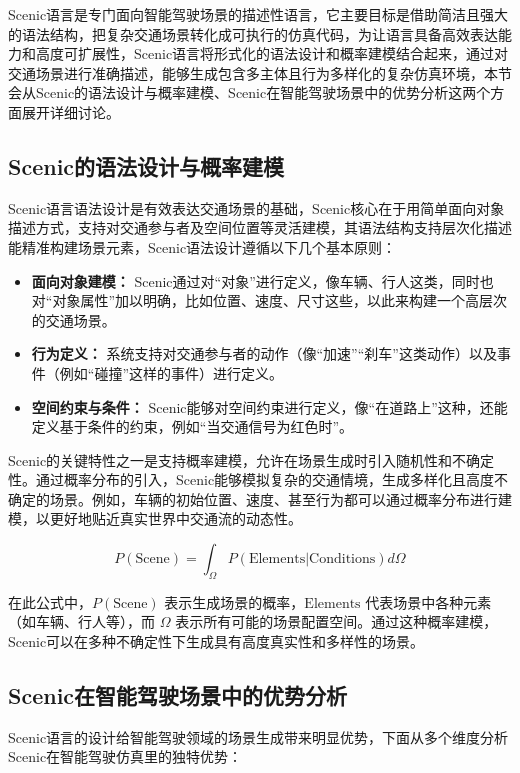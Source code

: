Scenic语言是专门面向智能驾驶场景的描述性语言，它主要目标是借助简洁且强大的语法结构，把复杂交通场景转化成可执行的仿真代码，为让语言具备高效表达能力和高度可扩展性，Scenic语言将形式化的语法设计和概率建模结合起来，通过对交通场景进行准确描述，能够生成包含多主体且行为多样化的复杂仿真环境，本节会从Scenic的语法设计与概率建模、Scenic在智能驾驶场景中的优势分析这两个方面展开详细讨论。
\subsection{Scenic的语法设计与概率建模}

Scenic语言语法设计是有效表达交通场景的基础，Scenic核心在于用简单面向对象描述方式，支持对交通参与者及空间位置等灵活建模，其语法结构支持层次化描述能精准构建场景元素，Scenic语法设计遵循以下几个基本原则：

\begin{itemize}
	\item \textbf{面向对象建模：} Scenic通过对“对象”进行定义，像车辆、行人这类，同时也对“对象属性”加以明确，比如位置、速度、尺寸这些，以此来构建一个高层次的交通场景。
	\item \textbf{行为定义：} 系统支持对交通参与者的动作（像“加速”“刹车”这类动作）以及事件（例如“碰撞”这样的事件）进行定义。
	\item \textbf{空间约束与条件：} Scenic能够对空间约束进行定义，像“在道路上”这种，还能定义基于条件的约束，例如“当交通信号为红色时”。
\end{itemize}

Scenic的关键特性之一是支持概率建模，允许在场景生成时引入随机性和不确定性。通过概率分布的引入，Scenic能够模拟复杂的交通情境，生成多样化且高度不确定的场景。例如，车辆的初始位置、速度、甚至行为都可以通过概率分布进行建模，以更好地贴近真实世界中交通流的动态性。

\begin{equation}
	P(\text{Scene}) = \int_{\Omega} P(\text{Elements} | \text{Conditions}) d\Omega
\end{equation}

在此公式中，$P(\text{Scene})$ 表示生成场景的概率，$\text{Elements}$ 代表场景中各种元素（如车辆、行人等），而 $\Omega$ 表示所有可能的场景配置空间。通过这种概率建模，Scenic可以在多种不确定性下生成具有高度真实性和多样性的场景。

\subsection{Scenic在智能驾驶场景中的优势分析}

Scenic语言的设计给智能驾驶领域的场景生成带来明显优势，下面从多个维度分析Scenic在智能驾驶仿真里的独特优势：

